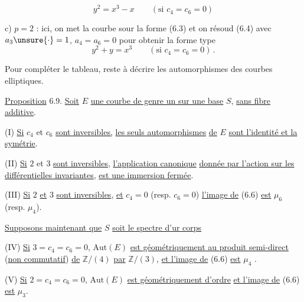 %
%
\[
y^2=x^3-x \qquad (\text{si }c_4=c_6=0) \tag*{(6.7)}
\]

c) $p=2$ : ici, on met la courbe sour la forme (6.3) et on résoud (6.4) avec $a_3\unsure{\cdot}=1$, $a_4=a_6=0$ pour obtenir la forme type
\[
y^2+y=x^3 \qquad (\text{si }c_4=c_6=0) \, . \tag*{(6.8)}
\]

Pour compléter le tableau, reste à décrire les automorphismes des courbes elliptiques.

\uline{Proposition} 6.9. \quad \uline{Soit} $E$ \uline{une courbe de genre un sur une base} $S$, \uline{sans fibre additive}.

(I) \quad \uline{Si} $c_4$ et $c_6$ \uline{sont inversibles,} \uline{les seuls automorphismes} \uline{de} $E$ \uline{sont l'identité et la symétrie}.

(II) \quad \uline{Si} $2$ et $3$ \uline{sont inversibles}, \uline{l'application canonique}
\uline{donnée par l'action sur les différentielles invariantes}, \uline{est une immersion fermée}.

(III) \uline{Si} $2$ \uline{et} $3$ \uline{sont inversibles}, \uline{et} $c_4=0$ (resp. $c_6=0$) \uline{l'image de} (6.6) \uline{est} $\mu_6$ (resp. $\mu_4$).

\uline{Supposons maintenant que} $S$ \uline{soit le spectre d'ur corps}

(IV) \quad \uline{Si} $3=c_4=c_6=0$, $\mathrm{Aut}(E)$ \uline{est géométriquement  au produit semi-direct} (\uline{non commutatif}) \uline{de} $\mathbb{Z}/(4)$ \uline{par} $\mathbb{Z}/(3)$, \uline{et l'image de} (6.6) \uline{est} $\mu_4$ .

(V) \quad \uline{Si} $2=c_4=c_6=0$, $\mathrm{Aut}(E)$ \uline{est géométriquement d'ordre}  \uline{et l'image de} (6.6) \uline{est} $\mu_3$.
